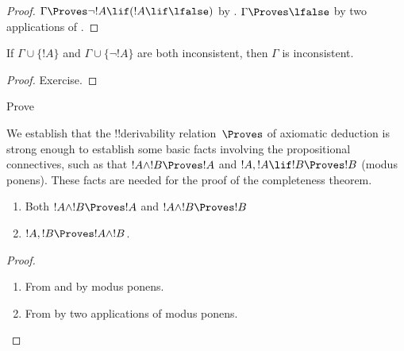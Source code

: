 \begin{proof}
  $\Gamma \Proves \lnot !A \lif (!A \lif \lfalse)$ by .
  $\Gamma \Proves \lfalse$ by two applications of .
\end{proof}


\begin{prop}
  If $\Gamma \cup \{!A\}$ and $\Gamma \cup \{\lnot !A\}$ are both
  inconsistent, then $\Gamma$ is inconsistent.
\end{prop}

\begin{proof}
Exercise.
\end{proof}


\begin{prob}
  Prove 
\end{prob}











\begin{explain}
  We establish that the !!{derivability} relation~$\Proves$ of
  axiomatic deduction is strong enough to establish some basic facts
  involving the propositional connectives, such as that $!A \land !B
  \Proves !A$ and $!A, !A \lif !B \Proves !B$ (modus ponens). These
  facts are needed for the proof of the completeness theorem.
\end{explain}

\begin{prop}
  \begin{enumerate}
  \item {} Both $!A \land !B \Proves
    !A$ and $!A \land !B \Proves !B$
  \item {} $!A, !B \Proves !A \land !B$.
  \end{enumerate}
\end{prop}

\begin{proof}
  \begin{enumerate}
    \item From  and  by
      modus ponens.
  \item From  by two applications of
    modus ponens.
  \end{enumerate}
\end{proof}


